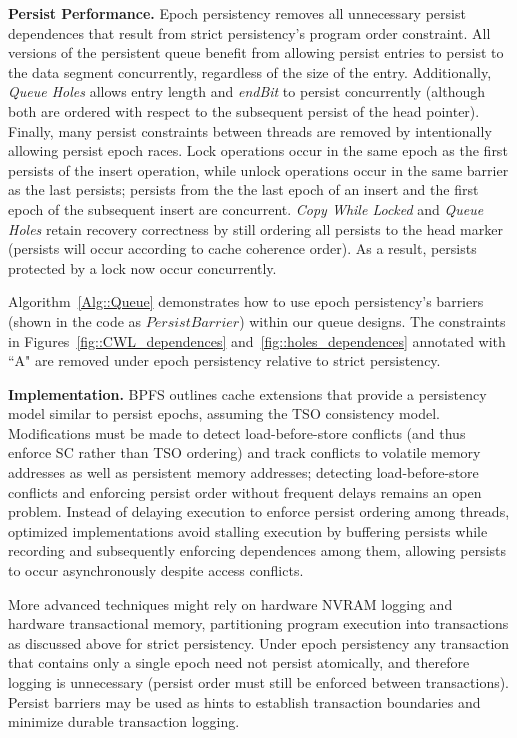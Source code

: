 \textbf{Persist Performance.}
Epoch persistency removes all unnecessary persist dependences that result from strict persistency's program order constraint.
All versions of the persistent queue benefit from allowing persist entries to persist to the data segment concurrently, regardless of the size of the entry.
Additionally, \emph{Queue Holes} allows entry length and \emph{endBit} to persist concurrently (although both are ordered with respect to the subsequent persist of the head pointer).
Finally, many persist constraints between threads are removed by intentionally allowing persist epoch races.
Lock operations occur in the same epoch as the first persists of the insert operation, while unlock operations occur in the same barrier as the last persists; persists from the the last epoch of an insert and the first epoch of the subsequent insert are concurrent.
\emph{Copy While Locked} and \emph{Queue Holes} retain recovery correctness by still ordering all persists to the head marker (persists will occur according to cache coherence order).
As a result, persists protected by a lock now occur concurrently.

Algorithm~\ref{Alg::Queue} demonstrates how to use epoch persistency's barriers (shown in the code as $PersistBarrier$) within our queue designs.
The constraints in Figures~\ref{fig::CWL_dependences} and~\ref{fig::holes_dependences} annotated with ``A" are removed under epoch persistency relative to strict persistency.

\textbf{Implementation.}
BPFS \cite{ConditNightingale09} outlines cache extensions that provide a persistency model similar to persist epochs, assuming the TSO consistency model.
Modifications must be made to detect load-before-store conflicts (and thus enforce SC rather than TSO ordering) and track conflicts to volatile memory addresses as well as persistent memory addresses; detecting load-before-store conflicts and enforcing persist order without frequent delays remains an open problem.
Instead of delaying execution to enforce persist ordering among threads, optimized implementations avoid stalling execution by buffering persists while recording and subsequently enforcing dependences among them, allowing persists to occur asynchronously despite access conflicts.

More advanced techniques might rely on hardware NVRAM logging and hardware transactional memory, partitioning program execution into transactions as discussed above for strict persistency.
Under epoch persistency any transaction that contains only a single epoch need not persist atomically, and therefore logging is unnecessary (persist order must still be enforced between transactions).
Persist barriers may be used as hints to establish transaction boundaries and minimize durable transaction logging.

